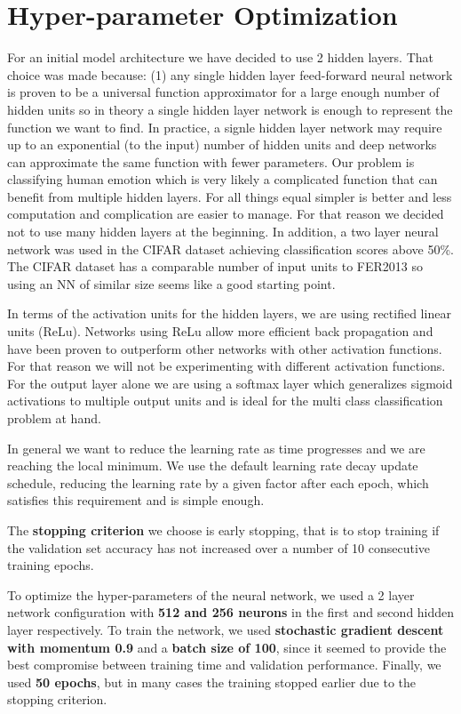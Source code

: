 \documentclass[12pt,twoside]{article}
\begin{document}
\section{Hyper-parameter Optimization}

For an initial model architecture we have decided to use 2 hidden layers. That choice was made because:
(1) any single hidden layer feed-forward neural network is proven to be a universal function approximator for a large enough number of hidden units so in theory a single hidden layer network is enough to represent the function we want to find. In practice, a signle hidden layer network may require up to an exponential (to the input) number of hidden units and deep networks can approximate the same function with fewer parameters. Our problem is classifying human emotion which is very likely a complicated function that can benefit from multiple hidden layers. For all things equal simpler is better and less computation and complication are easier to manage. For that reason we decided not to use many hidden layers at the beginning. In addition, a two layer neural network was used in the CIFAR dataset achieving classification scores above 50\%. The CIFAR dataset has a comparable number of input units to FER2013 so using an NN of similar size seems like a good starting point.

In terms of the activation units for the hidden layers, we are using rectified linear units (ReLu). Networks using ReLu allow more efficient back propagation and have been proven to outperform other networks with other activation functions. For that reason we will not be experimenting with different activation functions. For the output layer alone we are using a softmax layer which generalizes sigmoid activations to multiple output units and is ideal for the multi class classification problem at hand.

In general we want to reduce the learning rate as time progresses and we are reaching the local minimum. We use the default learning rate decay update schedule, reducing the learning rate by a given factor after each epoch, which satisfies this requirement and is simple enough.


The \textbf{stopping criterion} we choose is early stopping, that is to stop training if the validation set accuracy has not increased over a number of 10 consecutive training epochs.


To optimize the hyper-parameters of the neural network, we used a 2 layer network configuration with \textbf{512 and 256 neurons} in the first and second hidden layer respectively. To train the network, we used \textbf{stochastic gradient descent with momentum 0.9} and a \textbf{batch size of 100}, since it seemed to provide the best compromise between training time and validation performance. Finally, we used \textbf{50 epochs}, but in many cases the training stopped earlier due to the stopping criterion. 
\newline
\end{document}
